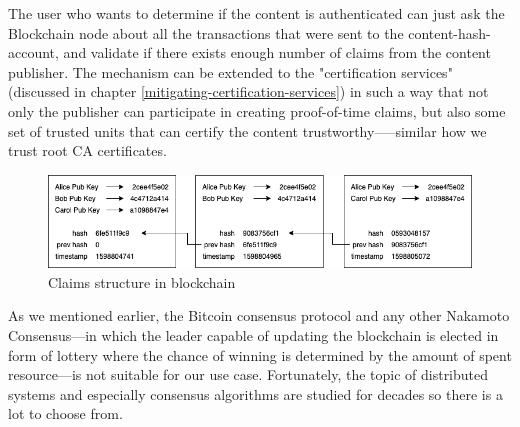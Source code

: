 The user who wants to determine if the content is authenticated can just ask the Blockchain node about all the transactions that were sent to the content-hash-account, and validate if there exists enough number of claims from the content publisher. 
The mechanism can be extended to the "certification services" (discussed in chapter \ref{mitigating-certification-services}) in such a way that not only the publisher can participate in creating proof-of-time claims, but also some set of trusted units that can certify the content trustworthy–––similar how we trust root CA certificates. 
\begin{figure}[h!]
\includegraphics[width=\textwidth]{img/claims-structure.png}
\centering
\caption{Claims structure in blockchain}
\label{fig:claims-structure}
\end{figure} 

As we mentioned earlier, the Bitcoin consensus protocol and any other Nakamoto Consensus––in which the leader capable of updating the blockchain is elected in form of lottery where the chance of winning is determined by the amount of spent resource––is not suitable for our use case. Fortunately, the topic of distributed systems and especially consensus algorithms are studied for decades so there is a lot to choose from.

